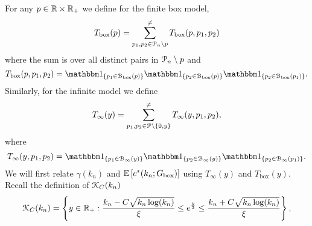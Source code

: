 %
%




For any $p \in {\ensuremath{\mathbb R}} \times {\ensuremath{\mathbb R}}_+$ we define for the finite box model,
\[
	T_{\text{box}}(p) = \sum^{\ne}_{p_1, p_2 \in {\mathcal P}_n \setminus p} T_{\text{box}}(p,p_1,p_2)
\]
where the sum is over all distinct pairs in ${\mathcal P}_n \setminus p$ and
\[
	T_{\text{box}}(p,p_1,p_2) = \ind{p_1 \in \BallPon{p}}\ind{p_2 \in \BallPon{p}}\ind{p_2 \in \BallPon{p_1}}.
\]
Similarly, for the infinite model we define
\[
	T_\infty(y) = \sum_{p_1, p_2 \in {\mathcal P} \setminus \{0,y\}}^{\ne} T_\infty(y,p_1,p_2),
\]
where
\[
	T_{\infty}(y,p_1,p_2) = \ind{p_1 \in \BallPo{y}}\ind{p_2 \in \BallPo{y}}\ind{p_2 \in \BallPo{p_1}}.
\]
We will first relate $\gamma(k_n)$ and $\mathbb{E}\left[c^\ast(k_n; G_{\text{box}})\right]$ using $T_\infty(y)$ and $T_{\text{box}}(y)$. Recall the definition of ${\mathcal K}_{C}(k_n)$
\[
	{\mathcal K}_C(k_n) = \left\{y \in {\ensuremath{\mathbb R}}_+ : \frac{k_n - C \sqrt{k_n \log(k_n)}}{\xi} \le e^{\frac{y}{2}}
	\le \frac{k_n + C \sqrt{k_n \log(k_n)}}{\xi} \right\},	
\]

